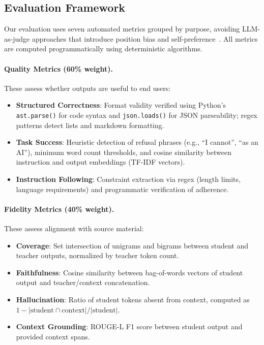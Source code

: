 \documentclass[sigconf]{acmart}
\begin{document}
\subsection{Evaluation Framework}

Our evaluation uses seven automated metrics grouped by purpose, avoiding LLM-as-judge approaches that introduce position bias and self-preference~\cite{zheng2023judging}. All metrics are computed programmatically using deterministic algorithms.

\paragraph{Quality Metrics (60\% weight).}
These assess whether outputs are useful to end users:
\begin{itemize}
    \item \textbf{Structured Correctness}: Format validity verified using Python's \texttt{ast.parse()} for code syntax and \texttt{json.loads()} for JSON parseability; regex patterns detect lists and markdown formatting.
    \item \textbf{Task Success}: Heuristic detection of refusal phrases (e.g., ``I cannot'', ``as an AI''), minimum word count thresholds, and cosine similarity between instruction and output embeddings (TF-IDF vectors).
    \item \textbf{Instruction Following}: Constraint extraction via regex (length limits, language requirements) and programmatic verification of adherence.
\end{itemize}

\paragraph{Fidelity Metrics (40\% weight).}
These assess alignment with source material:
\begin{itemize}
    \item \textbf{Coverage}: Set intersection of unigrams and bigrams between student and teacher outputs, normalized by teacher token count.
    \item \textbf{Faithfulness}: Cosine similarity between bag-of-words vectors of student output and teacher/context concatenation.
    \item \textbf{Hallucination}: Ratio of student tokens absent from context, computed as $1 - |\text{student} \cap \text{context}| / |\text{student}|$.
    \item \textbf{Context Grounding}: ROUGE-L F1 score between student output and provided context spans.
\end{itemize}
\end{document}
